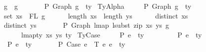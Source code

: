 \begin{isabellebody}
\ \ \ \ \ g{}\ {\isasymsimeq}\ g{}\ {\isacharequal}{\kern0pt}{\isacharequal}{\kern0pt}{\isachargreater}{\kern0pt}\isanewline
\ \ \ \ \ {\isasymGamma}\ {\isasymturnstile}{\isacharbraceleft}{\kern0pt}P{\isacharbraceright}{\kern0pt}\ Graph\ g{}\ {\isacharcolon}{\kern0pt}\ ty{\isachardoublequoteclose}\isanewline
{\isacharbar}{\kern0pt}\ TyAlpha{\isacharcolon}{\kern0pt}\isanewline
\ \ \ \ {\isachardoublequoteopen}{\isasymGamma}{}\ {\isasymturnstile}{\isacharbraceleft}{\kern0pt}P{\isacharbraceright}{\kern0pt}\ Graph\ g\ {\isacharcolon}{\kern0pt}\ ty\ {\isacharequal}{\kern0pt}{\isacharequal}{\kern0pt}{\isachargreater}{\kern0pt}\isanewline
\ \ \ \ \ set\ xs\ {\isacharequal}{\kern0pt}\ FL\ g\ {\isacharequal}{\kern0pt}{\isacharequal}{\kern0pt}{\isachargreater}{\kern0pt}\isanewline
\ \ \ \ \ length\ xs\ {\isacharequal}{\kern0pt}\ length\ ys\ {\isacharequal}{\kern0pt}{\isacharequal}{\kern0pt}{\isachargreater}{\kern0pt}\isanewline
\ \ \ \ \ distinct\ xs\ {\isacharequal}{\kern0pt}{\isacharequal}{\kern0pt}{\isachargreater}{\kern0pt}\isanewline
\ \ \ \ \ distinct\ ys\ {\isacharequal}{\kern0pt}{\isacharequal}{\kern0pt}{\isachargreater}{\kern0pt}\isanewline
\ \ \ \ \ {\isasymGamma}{}\ {\isasymturnstile}{\isacharbraceleft}{\kern0pt}P{\isacharbraceright}{\kern0pt}\ Graph\ {\isacharparenleft}{\kern0pt}lmap\ {\isacharparenleft}{\kern0pt}lsubst\ {\isacharparenleft}{\kern0pt}zip\ xs\ ys{\isacharparenright}{\kern0pt}{\isacharparenright}{\kern0pt}\ g{\isacharparenright}{\kern0pt}\isanewline
\ \ \ \ \ \ \ \ \ {\isacharcolon}{\kern0pt}\ lmap{\isacharunderscore}{\kern0pt}ty\ xs\ ys\ ty{\isachardoublequoteclose}\isanewline
{\isacharbar}{\kern0pt}\ TyCase{\isacharcolon}{\kern0pt}\isanewline
\ \ \ \ {\isachardoublequoteopen}{\isasymGamma}\ {\isasymturnstile}{\isacharbraceleft}{\kern0pt}P{\isacharbraceright}{\kern0pt}\ e{}\ {\isacharcolon}{\kern0pt}\ ty{}\ {\isacharequal}{\kern0pt}{\isacharequal}{\kern0pt}{\isachargreater}{\kern0pt}\isanewline
\ \ \ \ \ {\isasymGamma}{}\ {\isacharat}{\kern0pt}\ {\isasymGamma}\ {\isasymturnstile}{\isacharbraceleft}{\kern0pt}P{\isacharbraceright}{\kern0pt}\ e{}\ {\isacharcolon}{\kern0pt}\ ty{}\ {\isacharequal}{\kern0pt}{\isacharequal}{\kern0pt}{\isachargreater}{\kern0pt}\isanewline
\ \ \ \ \ {\isasymGamma}\ {\isasymturnstile}{\isacharbraceleft}{\kern0pt}P{\isacharbraceright}{\kern0pt}\ e{}\ {\isacharcolon}{\kern0pt}\ ty{}\ {\isacharequal}{\kern0pt}{\isacharequal}{\kern0pt}{\isachargreater}{\kern0pt}\isanewline
\ \ \ \ \ {\isasymGamma}\ {\isasymturnstile}{\isacharbraceleft}{\kern0pt}P{\isacharbraceright}{\kern0pt}\ Case\ e{}\ {\isasymGamma}{}\ T\ e{}\ e{}\ {\isacharcolon}{\kern0pt}\ ty{}{\isachardoublequoteclose}%

\end{isabellebody}
